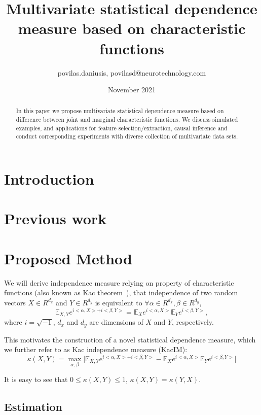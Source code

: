 \documentclass{article}
\title{Multivariate statistical dependence measure based on characteristic functions}
\author{povilas.daniusis, povilasd@neurotechnology.com}
\date{November 2021}
\begin{document}
\maketitle

\begin{abstract}
    In this paper we propose  multivariate statistical dependence measure based on difference between joint and marginal characteristic functions. We discuss simulated examples, and applications for feature selection/extraction, causal inference and conduct corresponding experiments with diverse collection of multivariate data sets.
\end{abstract}
\section{Introduction}
\section{Previous work}

\section{Proposed Method}

We will derive independence measure relying on property of characteristic functions (also known as Kac theorem~\cite{KacTheorem}), that independence of two random vectors $X \in R^{d_{x}}$ and $Y \in R^{d_{y}}$ is equivalent to $\forall \alpha \in R^{d_x}, \beta \in R^{d_y} $, \begin{equation}
\mathbb{E}_{X,Y} e^{i <\alpha, X> + i <\beta, Y>} = \mathbb{E}_{X} e^{i <\alpha, X>} \mathbb{E}_{Y} e^{i <\beta, Y>},
\end{equation}
where $i = \sqrt{-1}$, $d_{x}$ and $d_{y}$ are dimensions of $X$ and $Y$, respectively.

\noindent This motivates the construction of a novel statistical dependence measure, which we further refer to as Kac independence measure (KacIM):
\begin{equation}
\label{eq:kim}
    \kappa(X,Y) = \max_{\alpha, \beta} \vert \mathbb{E}_{X,Y} e^{i <\alpha, X> + i <\beta, Y>} -\mathbb{E}_{X} e^{i <\alpha, X>} \mathbb{E}_{Y} e^{i <\beta, Y>} \vert
\end{equation}

\noindent It is easy to see that $0 \leq \kappa(X,Y) \leq 1$, $\kappa(X,Y) = \kappa(Y,X)$. 

\subsection{Estimation}
\end{document}
